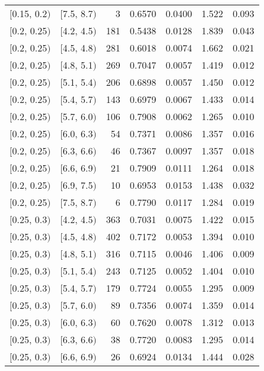 \begin{longtable}{| l | l | r | r | r | r | r |}
        $[$0.15, 0.2$)$ & $[$7.5, 8.7$)$ & 3   & 0.6570 & 0.0400 & 1.522 & 0.093 \\
        $[$0.2, 0.25$)$ & $[$4.2, 4.5$)$ & 181 & 0.5438 & 0.0128 & 1.839 & 0.043 \\
        $[$0.2, 0.25$)$ & $[$4.5, 4.8$)$ & 281 & 0.6018 & 0.0074 & 1.662 & 0.021 \\
        $[$0.2, 0.25$)$ & $[$4.8, 5.1$)$ & 269 & 0.7047 & 0.0057 & 1.419 & 0.012 \\
        $[$0.2, 0.25$)$ & $[$5.1, 5.4$)$ & 206 & 0.6898 & 0.0057 & 1.450 & 0.012 \\
        $[$0.2, 0.25$)$ & $[$5.4, 5.7$)$ & 143 & 0.6979 & 0.0067 & 1.433 & 0.014 \\
        $[$0.2, 0.25$)$ & $[$5.7, 6.0$)$ & 106 & 0.7908 & 0.0062 & 1.265 & 0.010 \\
        $[$0.2, 0.25$)$ & $[$6.0, 6.3$)$ & 54  & 0.7371 & 0.0086 & 1.357 & 0.016 \\
        $[$0.2, 0.25$)$ & $[$6.3, 6.6$)$ & 46  & 0.7367 & 0.0097 & 1.357 & 0.018 \\
        $[$0.2, 0.25$)$ & $[$6.6, 6.9$)$ & 21  & 0.7909 & 0.0111 & 1.264 & 0.018 \\
        $[$0.2, 0.25$)$ & $[$6.9, 7.5$)$ & 10  & 0.6953 & 0.0153 & 1.438 & 0.032 \\
        $[$0.2, 0.25$)$ & $[$7.5, 8.7$)$ & 6   & 0.7790 & 0.0117 & 1.284 & 0.019 \\
        $[$0.25, 0.3$)$ & $[$4.2, 4.5$)$ & 363 & 0.7031 & 0.0075 & 1.422 & 0.015 \\
        $[$0.25, 0.3$)$ & $[$4.5, 4.8$)$ & 402 & 0.7172 & 0.0053 & 1.394 & 0.010 \\
        $[$0.25, 0.3$)$ & $[$4.8, 5.1$)$ & 316 & 0.7115 & 0.0046 & 1.406 & 0.009 \\
        $[$0.25, 0.3$)$ & $[$5.1, 5.4$)$ & 243 & 0.7125 & 0.0052 & 1.404 & 0.010 \\
        $[$0.25, 0.3$)$ & $[$5.4, 5.7$)$ & 179 & 0.7724 & 0.0055 & 1.295 & 0.009 \\
        $[$0.25, 0.3$)$ & $[$5.7, 6.0$)$ & 89  & 0.7356 & 0.0074 & 1.359 & 0.014 \\
        $[$0.25, 0.3$)$ & $[$6.0, 6.3$)$ & 60  & 0.7620 & 0.0078 & 1.312 & 0.013 \\
        $[$0.25, 0.3$)$ & $[$6.3, 6.6$)$ & 38  & 0.7720 & 0.0083 & 1.295 & 0.014 \\
        $[$0.25, 0.3$)$ & $[$6.6, 6.9$)$ & 26  & 0.6924 & 0.0134 & 1.444 & 0.028 \\

\end{longtable}
